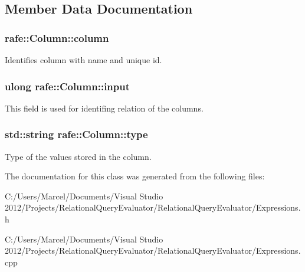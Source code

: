 \subsection{Member Data Documentation}
\hypertarget{classrafe_1_1_column_a7d991e6ad44729235c31910dcc885c5d}{
\subsubsection[{column}]{ rafe\+::\+Column\+::column}}\label{classrafe_1_1_column_a7d991e6ad44729235c31910dcc885c5d}
Identifies column with name and unique id. \hypertarget{classrafe_1_1_column_a1d4d38a6c74a83602c193c5a51f20780}{
\subsubsection[{input}]{\setlength{\rightskip}{0pt plus 5cm}ulong rafe\+::\+Column\+::input}}\label{classrafe_1_1_column_a1d4d38a6c74a83602c193c5a51f20780}
This field is used for identifing relation of the columns. \hypertarget{classrafe_1_1_column_a3e812878630c51153a69f372b1472ce6}{
\subsubsection[{type}]{\setlength{\rightskip}{0pt plus 5cm}std\+::string rafe\+::\+Column\+::type}}\label{classrafe_1_1_column_a3e812878630c51153a69f372b1472ce6}
Type of the values stored in the column. 

The documentation for this class was generated from the following files\+:\begin{DoxyCompactItemize}
\item 
C\+:/\+Users/\+Marcel/\+Documents/\+Visual Studio 2012/\+Projects/\+Relational\+Query\+Evaluator/\+Relational\+Query\+Evaluator/Expressions.\+h\item 
C\+:/\+Users/\+Marcel/\+Documents/\+Visual Studio 2012/\+Projects/\+Relational\+Query\+Evaluator/\+Relational\+Query\+Evaluator/Expressions.\+cpp\end{DoxyCompactItemize}
